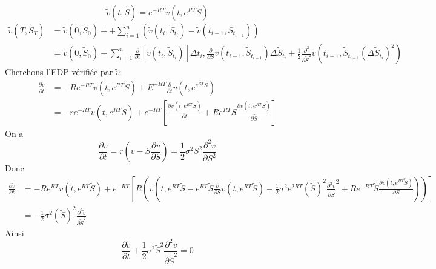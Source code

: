 \documentclass{article}
\theoremstyle{plain}
\theoremstyle{definition}
\begin{document}
\begin{equation}
\tilde{v}(t,\tilde{S})=e^{-RT}v(t,e^{RT}\tilde{S})
\end{equation}
\begin{equation}
\begin{split}
\tilde{v}(T,\tilde{S}_T)&=\tilde{v}(0,\tilde{S}_0)++\sum_{i=1}^n(\tilde{v}(t_i,\tilde{S}_{t_i})-\tilde{v}(t_{i-1},\tilde{S}_{t_{i-1}}))\\
&=\tilde{v}(0,\tilde{S}_0)+\sum_{i=1}^n \frac{\partial}{\partial t}[\tilde{v}(t_i, \tilde{S}_{t_i})]\Delta t_i,\frac{\partial}{\partial S}\tilde{v}(t_{i-1},\tilde{S}_{t_{i-1}})\Delta \tilde{S}_{t_i}+
\frac{1}{2}\frac{\partial^2}{\partial\tilde{S}^2}\tilde{v}(t_{i-1},\tilde{S}_{t_{i-1}}(\Delta\tilde{S}_{t_i})^2)
\end{split}
\end{equation}
Cherchons l'EDP v\'erifi\'ee par $\tilde{v}$:
\begin{equation}
\begin{split}
\frac{\partial\tilde{v}}{\partial t}&=-Re^{-RT}v(t,e^{RT}\tilde{S})+E^{-RT}\frac{\partial}{\partial t}v(t,e^{e^{RT}\tilde{S}})\\
&=-re^{-RT}v(t,e^{RT}\tilde{S})+e^{-RT}[\frac{\partial v(t,e^{RT}\tilde{S})}{\partial t}+Re^{RT}\tilde{S}\frac{\partial v(t,e^{RT}\tilde{S})}{\partial \tilde{S}}]
\end{split}
\end{equation}
On a
\begin{equation}
\frac{\partial v}{\partial t}=r(v-S\frac{\partial v}{\partial S})=\frac{1}{2}\sigma^2 S^2\frac{\partial^2v}{\partial S^2}
\end{equation}
Donc
\begin{equation}
\begin{split}
\frac{\partial\tilde{v}}{\partial t}&=-Re^{RT}v(t,e^{RT}\tilde{S})+e^{-RT}[R(v(t,e^{RT}\tilde{S}-e^{RT}\tilde{S}\frac{\partial}{\partial S}v(t,e^{RT}\tilde{S})-\frac{1}{2}\sigma^2e^{2RT}(\tilde{S})^2\frac{\partial^2 v}{\partial \tilde{S}}^2+Re^{-RT}\tilde{S}\frac{\partial v(t,e^{RT}\tilde{S})}{\partial S}))]\\
&=-\frac{1}{2}\sigma^2(\tilde{S})^2\frac{\partial^2\tilde{v}}{\partial\tilde{S}^2}
\end{split}
\end{equation}
Ainsi
\begin{equation}
\frac{\partial\tilde{v}}{\partial t}+\frac{1}{2}\sigma^2\tilde{S}^2\frac{\partial^2\tilde{v}}{\partial\tilde{S}^2}=0
\end{equation}
\end{document}
